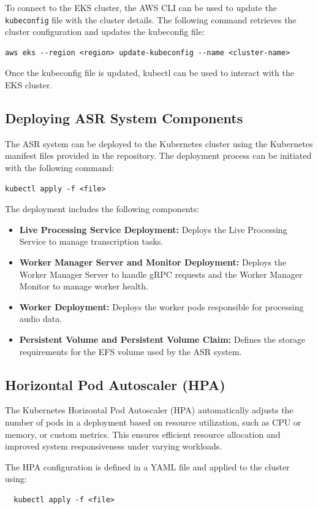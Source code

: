 To connect to the EKS cluster, the AWS CLI can be used to update the \texttt{kubeconfig} file with the cluster details. The following command retrieves the cluster configuration and updates the kubeconfig file:
\begin{verbatim}
aws eks --region <region> update-kubeconfig --name <cluster-name>
\end{verbatim}

Once the kubeconfig file is updated, kubectl can be used to interact with the EKS cluster.

\subsection{Deploying ASR System Components}
The ASR system can be deployed to the Kubernetes cluster using the Kubernetes manifest files provided in the repository. The deployment process can be initiated with the following command:
\begin{verbatim}
kubectl apply -f <file>
\end{verbatim}

The deployment includes the following components:
\begin{itemize}
    \item \textbf{Live Processing Service Deployment:} Deploys the Live Processing Service to manage transcription tasks.
    \item \textbf{Worker Manager Server and Monitor Deployment:} Deploys the Worker Manager Server to handle gRPC requests and the Worker Manager Monitor to manage worker health.
    \item \textbf{Worker Deployment:} Deploys the worker pods responsible for processing audio data.
    \item \textbf{Persistent Volume and Persistent Volume Claim:}  Defines the storage requirements for the EFS  volume used by the ASR system.
\end{itemize}

\subsection{Horizontal Pod Autoscaler (HPA)}
The Kubernetes Horizontal Pod Autoscaler (HPA) automatically adjusts the number of pods in a deployment based on resource utilization, such as CPU or memory, or custom metrics. This ensures efficient resource allocation and improved system responsiveness under varying workloads.

The HPA configuration is defined in a YAML file and applied to the cluster using:
\begin{verbatim}
  kubectl apply -f <file>
\end{verbatim}

